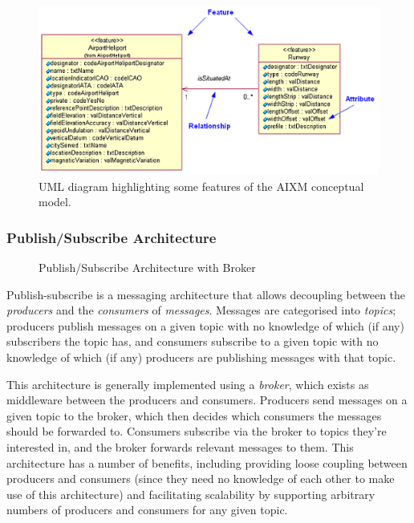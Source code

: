 \documentclass[a4paper, 12pt]{article}
\begin{document}
\begin{figure}
\begin{center}
\def\svgwidth{\columnwidth}
\includegraphics[scale=0.5]{aixmUML.png}
\end{center}
\caption{UML diagram highlighting some features of the AIXM conceptual model.\cite{aixm}}
\label{fig:example_net}
\end{figure}

\newpage

\subsubsection{Publish/Subscribe Architecture}

\begin{figure}
\begin{center}
\def\svgwidth{\columnwidth}

\end{center}
\caption{Publish/Subscribe Architecture with Broker}
\label{fig:example_net}
\end{figure}

Publish-subscribe is a messaging architecture that allows decoupling between the \emph{producers} and the \emph{consumers} of \emph{messages}. Messages are categorised into \emph{topics}; producers publish messages on a given topic with no knowledge of which (if any) subscribers the topic has, and consumers subscribe to a given topic with no knowledge of which (if any) producers are publishing messages with that topic.

This architecture is generally implemented using a \emph{broker}, which exists as middleware between the producers and consumers. Producers send messages on a given topic to the broker, which then decides which consumers the messages should be forwarded to. Consumers subscribe via the broker to topics they’re interested in, and the broker forwards relevant messages to them. This architecture has a number of benefits, including providing loose coupling between producers and consumers (since they need no knowledge of each other to make use of this architecture) and facilitating scalability by supporting arbitrary numbers of producers and consumers for any given topic.
\end{document}
